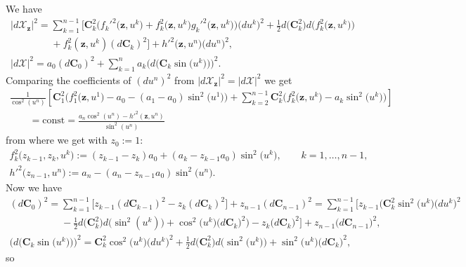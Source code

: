 \documentclass[11pt]{article}
\begin{document}
We have
\begin{gather*}
|d\mathcal{X}_{\mathbf{z}}|^2=\sum_{k=1}^{n-1}\big[\mathbf{C}_k^2\big(f_k'^2\big(\mathbf{z},u^k\big)
+f_k^2\big(\mathbf{z},u^k\big)g_k'^2\big(\mathbf{z},u^k\big)\big)\big(du^k\big)^2
+\tfrac{1}{2}d\big(\mathbf{C}_k^2\big)d\big(f_k^2\big(\mathbf{z},u^k\big)\big)
\\
\phantom{|d\mathcal{X}_{\mathbf{z}}|^2=}{}
+f_k^2(\mathbf{z},u^k)(d\mathbf{C}_k)^2\big]
+h'^2\big(\mathbf{z},u^n\big)\big(du^n\big)^2,\\
|d\mathcal{X}|^2=a_0(d\mathbf{C}_0)^2
+\sum_{k=1}^na_k\big(d\big(\mathbf{C}_k\sin\big(u^k\big)\big)\big)^2.
\end{gather*}
Comparing the coef\/f\/icients of $(du^n)^2$ from
$|d\mathcal{X}_{\mathbf{z}}|^2=|d\mathcal{X}|^2$ we get
\begin{gather*}
\frac{1}{\cos^2(u^n)}\left[\mathbf{C}_1^2\big(f_1^2\big(\mathbf{z},u^1\big)-a_0-(a_1-a_0)\sin^2\big(u^1\big)\big)+
\sum_{k=2}^{n-1}\mathbf{C}_k^2\big(f_k^2\big(\mathbf{z},u^k\big)-a_k\sin^2\big(u^k\big)\big)\right]
\\
\qquad {}=\mathrm{const}=\frac{a_n\cos^2(u^n)-h'^2(\mathbf{z},u^n)}{\sin^2(u^n)}
\end{gather*}
from where we get with $z_0:=1$:
\begin{gather*}
f_k^2\big(z_{k-1},z_k,u^k\big):=(z_{k-1}-z_k)a_0+(a_k-z_{k-1}a_0)\sin^2\big(u^k\big),\qquad
k=1,\dots ,n-1,
\\
h'^2\big(z_{n-1},u^n\big):=a_n-(a_n-z_{n-1}a_0)\sin^2\big(u^n\big).
\end{gather*}
Now we have
\begin{gather*}
(d\mathbf{C}_0)^2=\sum_{k=1}^{n-1}\big[z_{k-1}(d\mathbf{C}_{k-1})^2-z_k(d\mathbf{C}_k)^2\big]
+z_{n-1}(d\mathbf{C}_{n-1})^2=\sum_{k=1}^{n-1}\!\big[z_{k-1} \big(\mathbf{C}_k^2\sin^2\big(u^k\big)\big(du^k\big)^2
\\
\phantom{(d\mathbf{C}_0)^2=}{}
-\tfrac{1}{2}d\big(\mathbf{C}_k^2\big)d\big(\sin^2(u^k)\big)+\cos^2\big(u^k\big)\big(d\mathbf{C}_k\big)^2\big)
-z_k\big(d\mathbf{C}_k\big)^2\big] +z_{n-1}\big(d\mathbf{C}_{n-1}\big)^2,
\\
\big(d\big(\mathbf{C}_k\sin\big(u^k\big)\big)\big)^2=\mathbf{C}_k^2\cos^2\big(u^k\big)\big(du^k\big)^2
+\tfrac{1}{2}d\big(\mathbf{C}_k^2\big)d\big(\sin^2\big(u^k\big)\big)+\sin^2\big(u^k\big)\big(d\mathbf{C}_k\big)^2,
\end{gather*}
so
\end{document}
